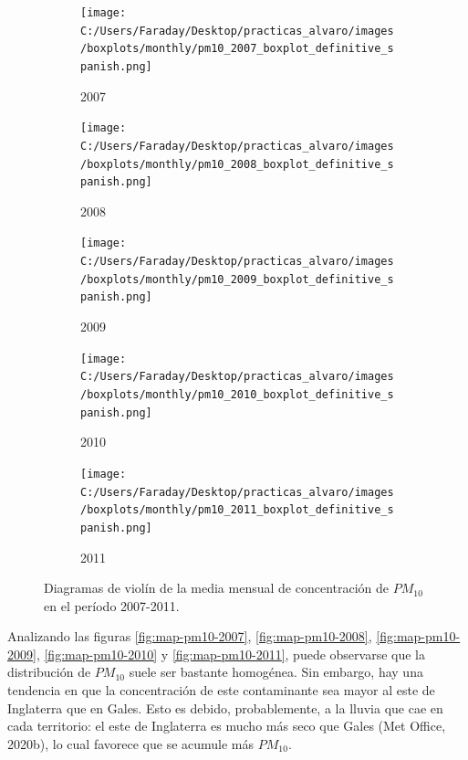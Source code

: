 \documentclass[12pt]{article}
\begin{document}
\begin{figure}[H]
\centering
\begin{subfigure}[H]{0.45\textwidth}
\texttt{[image: C:/Users/Faraday/Desktop/practicas\_alvaro/images/boxplots/monthly/pm10\_2007\_boxplot\_definitive\_spanish.png]}
\captionsetup{labelformat=empty}
\caption{2007}
\label{fig:box-pm10-2007}
\end{subfigure}
%
\begin{subfigure}[H]{0.45\textwidth}
\texttt{[image: C:/Users/Faraday/Desktop/practicas\_alvaro/images/boxplots/monthly/pm10\_2008\_boxplot\_definitive\_spanish.png]}
\captionsetup{labelformat=empty}
\caption{2008}
\label{fig:box-pm10-2008}
\end{subfigure}

\begin{subfigure}[H]{0.45\textwidth}
\texttt{[image: C:/Users/Faraday/Desktop/practicas\_alvaro/images/boxplots/monthly/pm10\_2009\_boxplot\_definitive\_spanish.png]}
\captionsetup{labelformat=empty}
\caption{2009}
\label{fig:box-pm10-2009}
\end{subfigure}
%
\begin{subfigure}[H]{0.45\textwidth}
\texttt{[image: C:/Users/Faraday/Desktop/practicas\_alvaro/images/boxplots/monthly/pm10\_2010\_boxplot\_definitive\_spanish.png]}
\captionsetup{labelformat=empty}
\caption{2010}
\label{fig:box-pm10-2010}
\end{subfigure}

\begin{subfigure}[H]{0.45\textwidth}
\texttt{[image: C:/Users/Faraday/Desktop/practicas\_alvaro/images/boxplots/monthly/pm10\_2011\_boxplot\_definitive\_spanish.png]}
\captionsetup{labelformat=empty}
\caption{2011}
\label{fig:box-pm10-2011}
\end{subfigure}
\caption{Diagramas de violín de la media mensual de concentración de $PM_{10}$ en el período 2007-2011.}
\label{fig:box-pm10-monthly}
\end{figure}

Analizando las figuras \ref{fig:map-pm10-2007}, \ref{fig:map-pm10-2008}, \ref{fig:map-pm10-2009}, \ref{fig:map-pm10-2010} y \ref{fig:map-pm10-2011}, puede observarse que la distribución de $PM_{10}$ suele ser bastante homogénea. Sin embargo, hay una tendencia en que la concentración de este contaminante sea mayor al este de Inglaterra que en Gales. Esto es debido, probablemente, a la lluvia que cae en cada territorio: el este de Inglaterra es mucho más seco que Gales (Met Office, 2020b), lo cual favorece que se acumule más $PM_{10}$.
\end{document}
